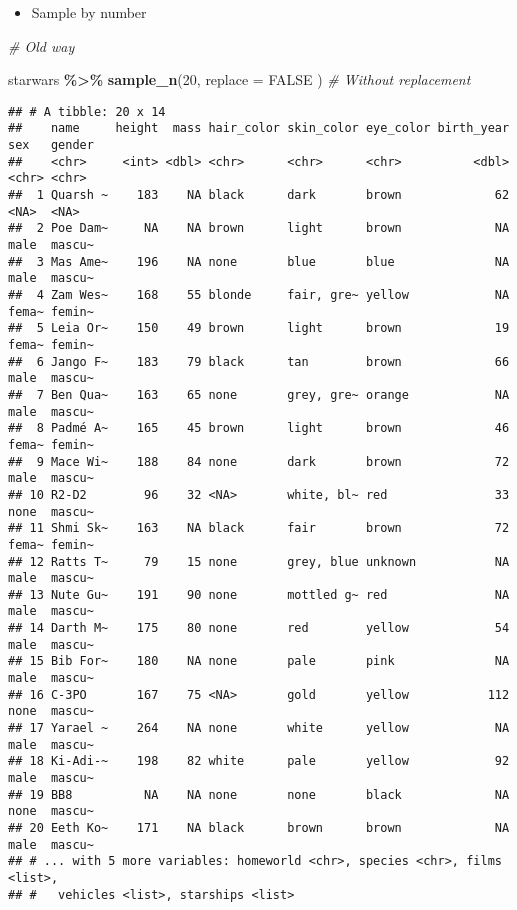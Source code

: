 \documentclass[
]{book}
\newenvironment{Shaded}{\begin{snugshade}}{\end{snugshade}}
\newcommand{\CommentTok}[1]{\textcolor[rgb]{0.56,0.35,0.01}{\textit{#1}}}
\newcommand{\DataTypeTok}[1]{\textcolor[rgb]{0.13,0.29,0.53}{#1}}
\newcommand{\DecValTok}[1]{\textcolor[rgb]{0.00,0.00,0.81}{#1}}
\newcommand{\KeywordTok}[1]{\textcolor[rgb]{0.13,0.29,0.53}{\textbf{#1}}}
\newcommand{\NormalTok}[1]{#1}
\newcommand{\OperatorTok}[1]{\textcolor[rgb]{0.81,0.36,0.00}{\textbf{#1}}}
\newcommand{\OtherTok}[1]{\textcolor[rgb]{0.56,0.35,0.01}{#1}}
\newcommand{\StringTok}[1]{\textcolor[rgb]{0.31,0.60,0.02}{#1}}
\providecommand{\tightlist}{%
  \setlength{\itemsep}{0pt}\setlength{\parskip}{0pt}}
\begin{document}
\begin{itemize}
\tightlist
\item
  Sample by number
\end{itemize}

\begin{Shaded}
\begin{Highlighting}[]
\CommentTok{\# Old way}

\NormalTok{starwars }\OperatorTok{\%\textgreater{}\%}
\StringTok{  }\KeywordTok{sample\_n}\NormalTok{(}\DecValTok{20}\NormalTok{,}
    \DataTypeTok{replace =} \OtherTok{FALSE}
\NormalTok{  ) }\CommentTok{\# Without replacement}
\end{Highlighting}
\end{Shaded}

\begin{verbatim}
## # A tibble: 20 x 14
##    name     height  mass hair_color skin_color eye_color birth_year sex   gender
##    <chr>     <int> <dbl> <chr>      <chr>      <chr>          <dbl> <chr> <chr> 
##  1 Quarsh ~    183    NA black      dark       brown             62 <NA>  <NA>  
##  2 Poe Dam~     NA    NA brown      light      brown             NA male  mascu~
##  3 Mas Ame~    196    NA none       blue       blue              NA male  mascu~
##  4 Zam Wes~    168    55 blonde     fair, gre~ yellow            NA fema~ femin~
##  5 Leia Or~    150    49 brown      light      brown             19 fema~ femin~
##  6 Jango F~    183    79 black      tan        brown             66 male  mascu~
##  7 Ben Qua~    163    65 none       grey, gre~ orange            NA male  mascu~
##  8 Padmé A~    165    45 brown      light      brown             46 fema~ femin~
##  9 Mace Wi~    188    84 none       dark       brown             72 male  mascu~
## 10 R2-D2        96    32 <NA>       white, bl~ red               33 none  mascu~
## 11 Shmi Sk~    163    NA black      fair       brown             72 fema~ femin~
## 12 Ratts T~     79    15 none       grey, blue unknown           NA male  mascu~
## 13 Nute Gu~    191    90 none       mottled g~ red               NA male  mascu~
## 14 Darth M~    175    80 none       red        yellow            54 male  mascu~
## 15 Bib For~    180    NA none       pale       pink              NA male  mascu~
## 16 C-3PO       167    75 <NA>       gold       yellow           112 none  mascu~
## 17 Yarael ~    264    NA none       white      yellow            NA male  mascu~
## 18 Ki-Adi-~    198    82 white      pale       yellow            92 male  mascu~
## 19 BB8          NA    NA none       none       black             NA none  mascu~
## 20 Eeth Ko~    171    NA black      brown      brown             NA male  mascu~
## # ... with 5 more variables: homeworld <chr>, species <chr>, films <list>,
## #   vehicles <list>, starships <list>
\end{verbatim}
\end{document}
